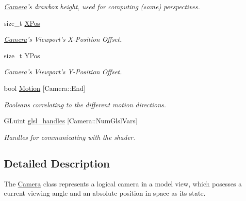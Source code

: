 \begin{DoxyCompactItemize}
\begin{DoxyCompactList}\small\item\em \hyperlink{class_camera}{\-Camera}'s drawbox height, used for computing (some) perspectives. \end{DoxyCompactList}\item 
\hypertarget{class_camera_a2e2fc28fcaa8222ac635a568950e6af3}{size\-\_\-t \hyperlink{class_camera_a2e2fc28fcaa8222ac635a568950e6af3}{\-X\-Pos}}\label{class_camera_a2e2fc28fcaa8222ac635a568950e6af3}

\begin{DoxyCompactList}\small\item\em \hyperlink{class_camera}{\-Camera}'s \-Viewport's \-X-\/\-Position \-Offset. \end{DoxyCompactList}\item 
\hypertarget{class_camera_af15974390620818974704b6e88cfedbd}{size\-\_\-t \hyperlink{class_camera_af15974390620818974704b6e88cfedbd}{\-Y\-Pos}}\label{class_camera_af15974390620818974704b6e88cfedbd}

\begin{DoxyCompactList}\small\item\em \hyperlink{class_camera}{\-Camera}'s \-Viewport's \-Y-\/\-Position \-Offset. \end{DoxyCompactList}\item 
bool \hyperlink{class_camera_a39746b4fadf30bba6bdc8aa6acfdc6f2}{\-Motion} \mbox{[}\-Camera\-::\-End\mbox{]}
\begin{DoxyCompactList}\small\item\em \-Booleans correlating to the different motion directions. \end{DoxyCompactList}\item 
\-G\-Luint \hyperlink{class_camera_a1635486d7f9e0d52b241899a270ee335}{glsl\-\_\-handles} \mbox{[}\-Camera\-::\-Num\-Glsl\-Vars\mbox{]}
\begin{DoxyCompactList}\small\item\em \-Handles for communicating with the shader. \end{DoxyCompactList}\end{DoxyCompactItemize}


\subsection{\-Detailed \-Description}
\-The \hyperlink{class_camera}{\-Camera} class represents a logical camera in a model view, which posesses a current viewing angle and an absolute position in space as its state. 

